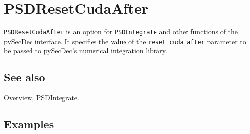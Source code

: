 \documentclass[../FeynHelpersManual.tex]{subfiles}
\begin{document}
\hypertarget{psdresetcudaafter}{
\section{PSDResetCudaAfter}\label{psdresetcudaafter}}

\texttt{PSDResetCudaAfter} is an option for \texttt{PSDIntegrate} and
other functions of the pySecDec interface. It specifies the value of the
\texttt{reset_cuda_after} parameter to be passed to pySecDec's numerical
integration library.

\subsection{See also}

\hyperlink{toc}{Overview}, \hyperlink{psdintegrate}{PSDIntegrate}.

\subsection{Examples}
\end{document}
